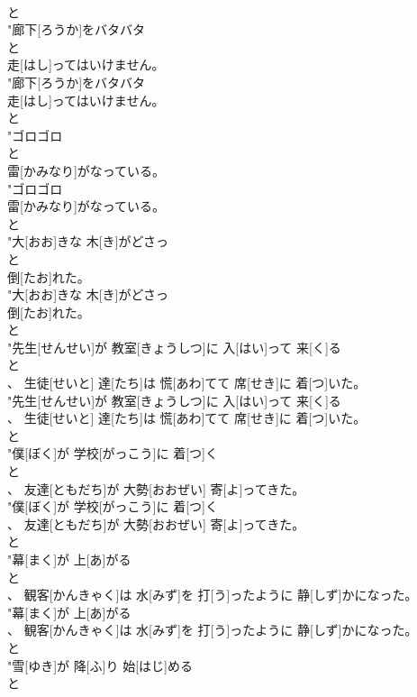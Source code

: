 \documentclass[8pt]{extreport}
\begin{document}
\begin{CJK}{UTF8}{min}
\\	と
\\	"廊下[ろうか]をバタバタ
\\	と
\\	走[はし]ってはいけません。
\\	"廊下[ろうか]をバタバタ
\\	走[はし]ってはいけません。
\\	と
\\	"ゴロゴロ
\\	と
\\	雷[かみなり]がなっている。
\\	"ゴロゴロ
\\	雷[かみなり]がなっている。
\\	と
\\	"大[おお]きな 木[き]がどさっ
\\	と
\\	倒[たお]れた。
\\	"大[おお]きな 木[き]がどさっ
\\	倒[たお]れた。
\\	と
\\	"先生[せんせい]が 教室[きょうしつ]に 入[はい]って 来[く]る
\\	と
\\	、 生徒[せいと] 達[たち]は 慌[あわ]てて 席[せき]に 着[つ]いた。
\\	"先生[せんせい]が 教室[きょうしつ]に 入[はい]って 来[く]る
\\	、 生徒[せいと] 達[たち]は 慌[あわ]てて 席[せき]に 着[つ]いた。
\\	と
\\	"僕[ぼく]が 学校[がっこう]に 着[つ]く
\\	と
\\	、 友達[ともだち]が 大勢[おおぜい] 寄[よ]ってきた。
\\	"僕[ぼく]が 学校[がっこう]に 着[つ]く
\\	、 友達[ともだち]が 大勢[おおぜい] 寄[よ]ってきた。
\\	と
\\	"幕[まく]が 上[あ]がる
\\	と
\\	、 観客[かんきゃく]は 水[みず]を 打[う]ったように 静[しず]かになった。
\\	"幕[まく]が 上[あ]がる
\\	、 観客[かんきゃく]は 水[みず]を 打[う]ったように 静[しず]かになった。
\\	と
\\	"雪[ゆき]が 降[ふ]り 始[はじ]める
\\	と

\end{CJK}
\end{document}
